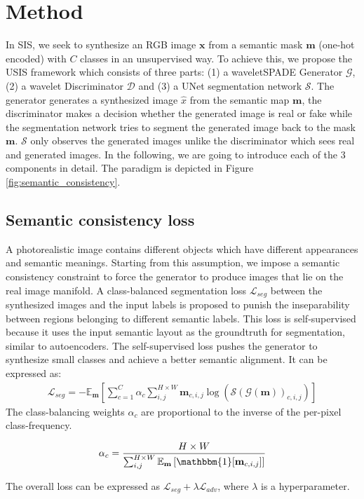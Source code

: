 \documentclass{article}
\begin{document}
\section{Method}
\label{sec:method}
In SIS, we seek to synthesize an RGB image $\textbf{x}$ from a semantic mask $\textbf{m}$ (one-hot encoded) with $C$ classes in an unsupervised way. To achieve this, we propose the USIS framework which consists of three parts: (1) a waveletSPADE Generator $\mathcal{G}$, (2) a wavelet Discriminator $\mathcal{D}$ and (3) a UNet segmentation network $\mathcal{S}$. The generator generates a synthesized image $\hat{x}$ from the semantic map $\mathbf{m}$, the discriminator makes a decision whether the generated image is real or fake while the segmentation network tries to segment the generated image back to the mask $\mathbf{m}$. $\mathcal{S}$ only observes the generated images unlike the discriminator which sees real and generated images. In the following, we are going to introduce each of the 3 components in detail. The paradigm is depicted in Figure \ref{fig:semantic_consistency}.
\vspace{-2em}
\subsection{Semantic consistency loss}

A photorealistic image contains different objects which have different appearances and semantic meanings. Starting from this assumption, we impose a semantic consistency constraint to force the generator to produce images that lie on the real image manifold. A class-balanced segmentation loss $\mathcal{L}_{seg}$ between the synthesized images and the input labels is proposed to punish the inseparability between regions belonging to different semantic labels. This loss is self-supervised because it uses the input semantic layout as the groundtruth for segmentation, similar to autoencoders. The self-supervised loss pushes the generator to synthesize small classes and achieve a better semantic alignment. It can be expressed as: 
\begin{equation}
    \begin{aligned}
    \mathcal{L}_{seg} = - \mathbb{E}_{\textbf{m} } \left[ \sum_{c=1}^{C}\alpha_{c}\sum_{i,j}^{H \times W}\textbf{m}_{c,i,j} \log(\mathcal{S}(\mathcal{G}(\textbf{m}))_{c,i,j}) \right]    \end{aligned}
\end{equation}
The class-balancing weights $\alpha_{c}$ are proportional to the inverse of the per-pixel class-frequency.
\begin{ceqn}
    \begin{align}
    \alpha_{c} = \frac{H \times W}{ \sum_{i,j}^{H \times W} \mathbb{E}_{\textbf{m}} \left[ \mathbbm{1}[\textbf{m}_{c,i,j}] \right] } 
    \end{align}
\end{ceqn}
The overall loss can be expressed as $\mathcal{L}_{seg} + \lambda \mathcal{L}_{adv}$, where $\lambda$ is a hyperparameter.
\vspace{-1em}
\end{document}
